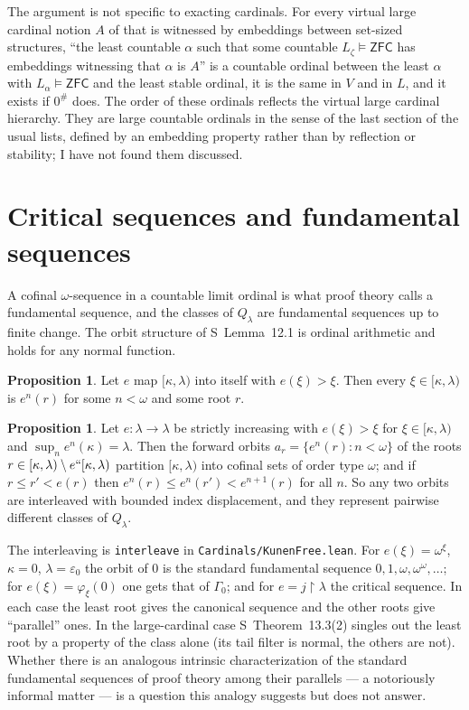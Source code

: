 \documentclass[11pt,letterpaper]{article}
\theoremstyle{definition}
\newtheorem{proposition}[definition]{Proposition}
\numberwithin{equation}{section}
\newcommand{\ZFC}{\mathsf{ZFC}}
\newcommand{\restr}{\mathbin{\upharpoonright}}
\begin{document}
The argument is not specific to exacting cardinals. For every virtual large cardinal notion $A$ of \cite{gs} that is witnessed by embeddings between set-sized structures, ``the least countable $\alpha$ such that some countable $L_\zeta\models\ZFC$ has embeddings witnessing that $\alpha$ is $A$'' is a countable ordinal between the least $\alpha$ with $L_\alpha\models\ZFC$ and the least stable ordinal, it is the same in $V$ and in $L$, and it exists if $0^\#$ does. The order of these ordinals reflects the virtual large cardinal hierarchy. They are large countable ordinals in the sense of the last section of the usual lists, defined by an embedding property rather than by reflection or stability; I have not found them discussed.

\section{Critical sequences and fundamental sequences}

A cofinal $\omega$-sequence in a countable limit ordinal is what proof theory calls a fundamental sequence, and the classes of $Q_\lambda$ are fundamental sequences up to finite change. The orbit structure of S~Lemma~12.1 is ordinal arithmetic and holds for any normal function.

\begin{proposition}\label{prop:root}
Let $e$ map $[\kappa,\lambda)$ into itself with $e(\xi)>\xi$. Then every $\xi\in[\kappa,\lambda)$ is $e^n(r)$ for some $n<\omega$ and some root $r$.
\end{proposition}

\begin{proposition}\label{prop:interleave}
Let $e:\lambda\to\lambda$ be strictly increasing with $e(\xi)>\xi$ for $\xi\in[\kappa,\lambda)$ and $\sup_ne^n(\kappa)=\lambda$. Then the forward orbits $a_r=\{e^n(r):n<\omega\}$ of the roots $r\in[\kappa,\lambda)\setminus e``[\kappa,\lambda)$ partition $[\kappa,\lambda)$ into cofinal sets of order type $\omega$; and if $r\le r'<e(r)$ then $e^n(r)\le e^n(r')<e^{n+1}(r)$ for all $n$. So any two orbits are interleaved with bounded index displacement, and they represent pairwise different classes of $Q_\lambda$.
\end{proposition}

The interleaving is \nolinkurl{interleave} in \nolinkurl{Cardinals/KunenFree.lean}. For $e(\xi)=\omega^\xi$, $\kappa=0$, $\lambda=\varepsilon_0$ the orbit of $0$ is the standard fundamental sequence $0,1,\omega,\omega^\omega,\dots$; for $e(\xi)=\varphi_\xi(0)$ one gets that of $\Gamma_0$; and for $e=j\restr\lambda$ the critical sequence. In each case the least root gives the canonical sequence and the other roots give ``parallel'' ones. In the large-cardinal case S~Theorem~13.3(2) singles out the least root by a property of the class alone (its tail filter is normal, the others are not). Whether there is an analogous intrinsic characterization of the standard fundamental sequences of proof theory among their parallels --- a notoriously informal matter --- is a question this analogy suggests but does not answer.
\end{document}
